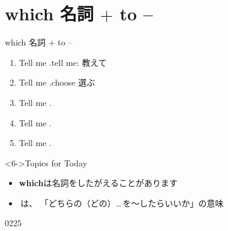 \documentclass[aspectratio=169,xcolor={dvipsnames,table}]{beamer}
\begin{document}
\section{which 名詞 $+$ to --}
\begin{frame}[plain]{which 名詞 $+$ to --}

\dbend

\bigskip

 \begin{enumerate}
  \item<1-> Tell me .\hfill{\scriptsize tell me: 教えて}
  \item<2-> Tell me .\hfill{\scriptsize choose  選ぶ}
  \item<3-> Tell me .
  \item<4-> Tell me .
  \item<5-> Tell me .
 \end{enumerate}
%
\vfill

\begin{block}<6->{Topics for Today}
\begin{itemize}[square]\small
 \item \textbf{which}は名詞をしたがえることがあります
 \item {}\,は、
「どちらの（どの）\ldots{}\,を～したらいいか」の意味
 \end{itemize}
     \end{block}
\hfill{\tiny 0225}\,{\scriptsize {}}

\end{frame}
\end{document}
